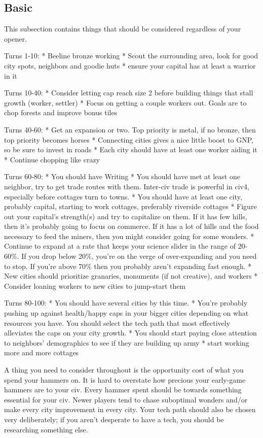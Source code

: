 \documentclass[10pt]{article}
\begin{document}
\subsection*{Basic}

This subsection contains things that should be considered regardless of your opener.

Turns 1-10:
* Beeline bronze working
* Scout the surrounding area, look for good city spots, neighbors and goodie huts
* ensure your capital has at least a warrior in it

Turns 10-40:
* Consider letting cap reach size 2 before building things that stall growth (worker, settler)
* Focus on getting a couple workers out. Goals are to chop forests and improve bonus tiles

Turns 40-60:
* Get an expansion or two. Top priority is metal, if no bronze, then top priority becomes horses
* Connecting cities gives a nice little boost to GNP, so be sure to invest in roads
* Each city should have at least one worker aiding it
* Continue chopping like crazy

Turns 60-80:
* You should have Writing
* You should have met at least one neighbor, try to get trade routes with them. Inter-civ trade is powerful in civ4, especially
  before cottages turn to towns.
* You should have at least one city, probably capital, starting to work cottages, preferably riverside cottages
* Figure out your capital's strength(s) and try to capitalize on them. If it has few hills, then it's probably
  going to focus on commerce. If it has a lot of hills and the food necessary to feed the miners, then you might
  consider going for some wonders.
* Continue to expand at a rate that keeps your science slider in the range of 20-60\%. If you drop below 20\%,
  you're on the verge of over-expanding and you need to stop. If you're above 70\% then you probably aren't
  expanding fast enough.
* New cities should prioritize granaries, monuments (if not creative), and workers
* Consider loaning workers to new cities to jump-start them

Turns 80-100:
* You should have several cities by this time.
* You're probably pushing up against health/happy caps in your bigger cities depending on what
  resources you have. You should select the tech path that most effectively alleviates the caps
  on your city growth.
* You should start paying close attention to neighbors' demographics to see if they are building up army
* start working more and more cottages

A thing you need to consider throughout is the opportunity cost of what you spend your hammers on. It is
hard to overstate how precious your early-game hammers are to your civ. Every hammer spent should be
towards something essential for your civ. Newer players tend to chase suboptimal wonders and/or make every city
improvement in every city. Your tech path should also be chosen very deliberately; if you aren't desperate
to have a tech, you should be researching something else.
\end{document}

